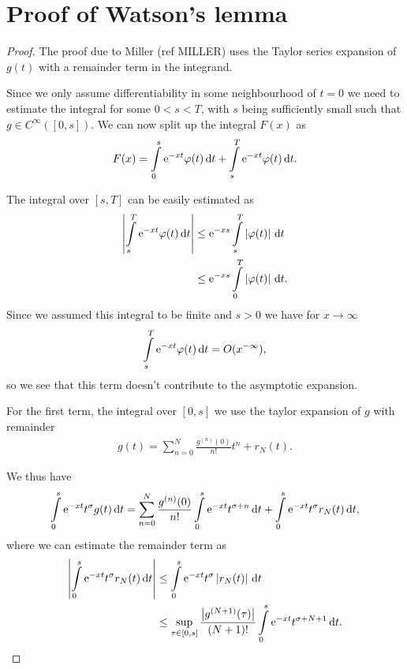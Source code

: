 \section{Proof of Watson's lemma}
\label{sec:proof-watson}
\begin{theorem}
    
    \begin{proof}
        The proof due to Miller (ref MILLER) uses the Taylor series expansion of
        $g(t)$ with a remainder term in the integrand.

        Since we only assume differentiability in some neighbourhood of $t=0$ we
        need to estimate the integral for some $0 < s < T$, with $s$ being
        sufficiently small such that $g\in C^{\infty}([0,s])$. We can now split
        up the integral $F(x)$ as
        \begin{align*}
            F(x) = \Integ[s]{0}{t}{\Eto{-xt}\phi(t)} +
                   \Integ[T]{s}{t}{\Eto{-xt}\phi(t)}.
        \end{align*}

        The integral over $\left[s,T\right]$ can be easily estimated as
        \begin{align*}
            \left|\Integ[T]{s}{t}{\Eto{-xt}\phi(t)}\right| &\le
            \Eto{-xs} \Integ[T]{s}{t}{\left|\phi(t)\right|} \\
            &\le \Eto{-xs}\Integ[T]{0}{t}{\left|\phi(t)\right|}.
        \end{align*}
        Since we assumed this integral to be finite and $s>0$ we have for
        $x\to\infty$
        \begin{align}
            \Integ[T]st{\Eto{-xt}\phi(t)} = O(x^{-\infty}),
        \end{align}
        so we see that this term doesn't contribute to the asymptotic expansion.

        For the first term, the integral over $\left[0,s\right]$ we use the
        taylor expansion of $g$ with remainder
        \begin{align*}
            g(t) = \sum_{n=0}^{N} \frac{g^{(n)}(0)}{n!}t^n + r_N(t).
        \end{align*}

        We thus have
        \begin{align*}
            \Integ[s]0t{\Eto{-xt}t^\sigma g(t)} = \sum_{n=0}^N
            \frac{g^{(n)}(0)}{n!} \Integ[s]0t{\Eto{-xt}t^{\sigma+n}} +
            \Integ[s]0t{\Eto{-xt}t^\sigma r_N(t)},
        \end{align*}
        where we can estimate the remainder term as
        \begin{align*}
            \left|\Integ[s]0t{\Eto{-xt}t^\sigma r_N(t)}\right| &\le
            \Integ[s]0t{\Eto{-xt}t^\sigma\left|r_N(t)\right|} \\
            &\le \sup_{\tau\in\left[0,s\right]}
            \frac{\bigl|g^{(N+1)}(\tau)\bigr|}{(N+1)!}\Integ[s]0t{\Eto{-xt}t^{\sigma+N+1}}.
        \end{align*}


\end{proof}
\end{theorem}

